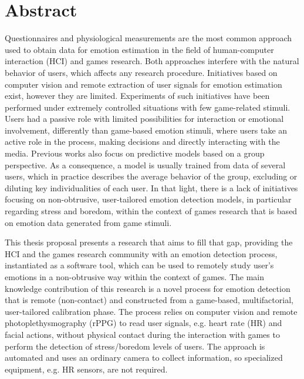 \chapter*{Abstract}

Questionnaires and physiological measurements are the most common approach used to obtain data for emotion estimation in the field of human-computer interaction (HCI) and games research. Both approaches interfere with the natural behavior of users, which affects any research procedure. Initiatives based on computer vision and remote extraction of user signals for emotion estimation exist, however they are limited. Experiments of such initiatives have been performed under extremely controlled situations with few game-related stimuli. Users had a passive role with limited possibilities for interaction or emotional involvement, differently than game-based emotion stimuli, where users take an active role in the process, making decisions and directly interacting with the media. Previous works also focus on predictive models based on a group perspective. As a consequence, a model is usually trained from data of several users, which in practice describes the average behavior of the group, excluding or diluting key individualities of each user. In that light, there is a lack of initiatives focusing on non-obtrusive, user-tailored emotion detection models, in particular regarding stress and boredom, within the context of games research that is based on emotion data generated from game stimuli.

This thesis proposal presents a research that aims to fill that gap, providing the HCI and the games research community with an emotion detection process, instantiated as a software tool, which can be used to remotely study user's emotions in a non-obtrusive way within the context of games. The main knowledge contribution of this research is a novel process for emotion detection that is remote (non-contact) and constructed from a game-based, multifactorial, user-tailored calibration phase. The process relies on computer vision and remote photoplethysmography (rPPG) to read user signals, e.g. heart rate (HR) and facial actions, without physical contact during the interaction with games to perform the detection of stress/boredom levels of users. The approach is automated and uses an ordinary camera to collect information, so specialized equipment, e.g. HR sensors, are not required.

